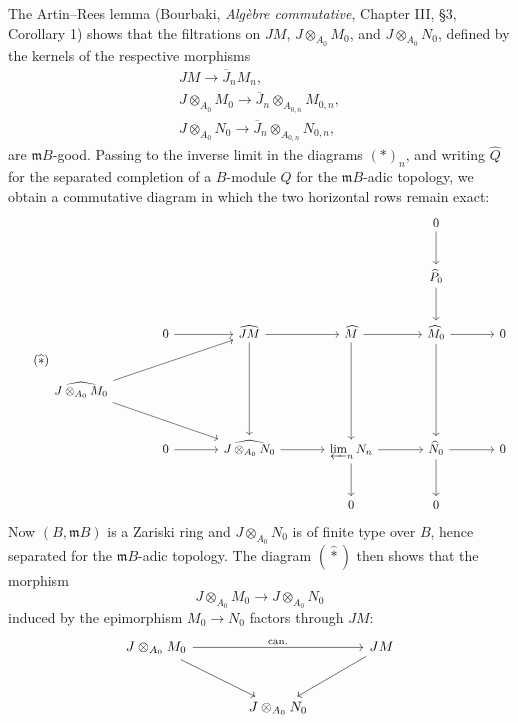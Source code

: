 The Artin--Rees lemma (Bourbaki, \emph{Algèbre commutative}, Chapter
III, §3, Corollary 1) shows that the filtrations on \(JM\),
\(J\otimes_{A_0}M_0\), and \(J\otimes_{A_0}N_0\), defined by the
kernels of the respective morphisms
\[
\begin{gathered}
  JM\longrightarrow \overline{J}_nM_n,\\
  J\otimes_{A_0}M_0
    \longrightarrow \overline{J}_n\otimes_{A_{0,n}}M_{0,n},\\
  J\otimes_{A_0}N_0
    \longrightarrow \overline{J}_n\otimes_{A_{0,n}}N_{0,n},
\end{gathered}
\]
are \(\mathfrak mB\)-good. Passing to the inverse limit in the
diagrams \((\ast)_n\), and writing \(\widehat Q\) for the separated
completion of a \(B\)-module \(Q\) for the \(\mathfrak mB\)-adic
topology, we obtain a commutative diagram in which the two horizontal
rows remain exact:
\[
\tag{$\widehat\ast$}\label{sga3:xv:lemma:2-8:equation:widehat-ast}
\begin{tikzcd}[column sep=large,row sep=large]
&&&& 0 \arrow[d] & \\
&&&& \widehat P_0 \arrow[d] & \\
& 0 \arrow[r]
  & \widehat{JM} \arrow[r] \arrow[dd]
  & \widehat M \arrow[r] \arrow[dd]
  & \widehat M_0 \arrow[r] \arrow[dd] & 0 \\
\widehat{J\otimes_{A_0}M_0}
      \arrow[urr] \arrow[drr] &&&&& \\
& 0 \arrow[r]
  & \widehat{J\otimes_{A_0}N_0} \arrow[r]
  & \varprojlim_n N_n \arrow[r] \arrow[d]
  & \widehat N_0 \arrow[r] \arrow[d] & 0 \\
&&& 0 & 0 &
\end{tikzcd}
\]
Now \((B,\mathfrak mB)\) is a Zariski ring and
\(J\otimes_{A_0}N_0\) is of finite type over \(B\), hence separated
for the \(\mathfrak mB\)-adic topology. The diagram
\((\widehat\ast)\) then shows that the morphism
\[
  J\otimes_{A_0}M_0\longrightarrow J\otimes_{A_0}N_0
\]
induced by the epimorphism \(M_0\to N_0\) factors through \(JM\):
\[
\begin{tikzcd}[column sep=large,row sep=large]
J\otimes_{A_0}M_0 \arrow[rr,"\mathrm{can.}"] \arrow[dr]
  && JM \arrow[dl] \\
& J\otimes_{A_0}N_0 &
\end{tikzcd}
\]

